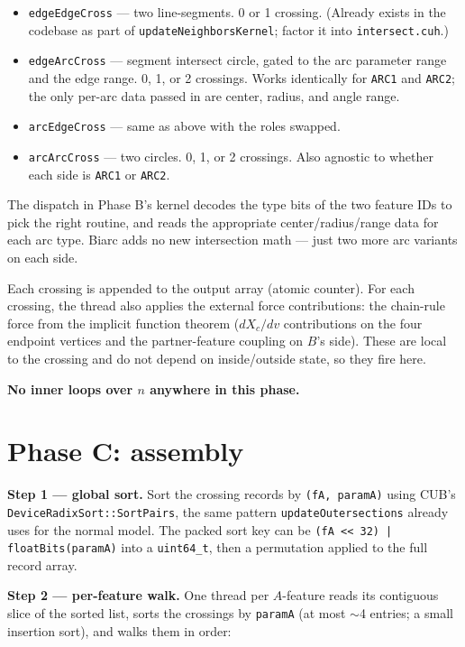 \documentclass[11pt]{article}
\newcommand{\code}[1]{\texttt{#1}}
\begin{document}
\begin{itemize}[leftmargin=*]
  \item \code{edgeEdgeCross} --- two line-segments. 0 or 1 crossing.
        (Already exists in the codebase as part of
        \code{updateNeighborsKernel}; factor it into
        \code{intersect.cuh}.)
  \item \code{edgeArcCross} --- segment intersect circle, gated to the
        arc parameter range and the edge range. 0, 1, or 2 crossings.
        Works identically for \code{ARC1} and \code{ARC2}; the only
        per-arc data passed in are center, radius, and angle range.
  \item \code{arcEdgeCross} --- same as above with the roles swapped.
  \item \code{arcArcCross} --- two circles. 0, 1, or 2 crossings. Also
        agnostic to whether each side is \code{ARC1} or \code{ARC2}.
\end{itemize}

The dispatch in Phase B's kernel decodes the type bits of the two
feature IDs to pick the right routine, and reads the appropriate
center/radius/range data for each arc type. Biarc adds no new
intersection math --- just two more arc variants on each side.

Each crossing is appended to the output array (atomic counter). For
each crossing, the thread also applies the external force
contributions: the chain-rule force from the implicit function theorem
($dX_c/dv$ contributions on the four endpoint vertices and the
partner-feature coupling on $B$'s side). These are local to the
crossing and do not depend on inside/outside state, so they fire
here.

\textbf{No inner loops over $n$ anywhere in this phase.}

\section{Phase C: assembly}\label{sec:phaseC}

\textbf{Step 1 --- global sort.} Sort the crossing records by
\code{(fA, paramA)} using CUB's \code{DeviceRadixSort::SortPairs}, the
same pattern \code{updateOutersections} already uses for the normal
model. The packed sort key can be \code{(fA << 32) | floatBits(paramA)}
into a \code{uint64\_t}, then a permutation applied to the full record
array.

\textbf{Step 2 --- per-feature walk.} One thread per $A$-feature reads
its contiguous slice of the sorted list, sorts the crossings by
\code{paramA} (at most $\sim$4 entries; a small insertion sort), and
walks them in order:
\end{document}
